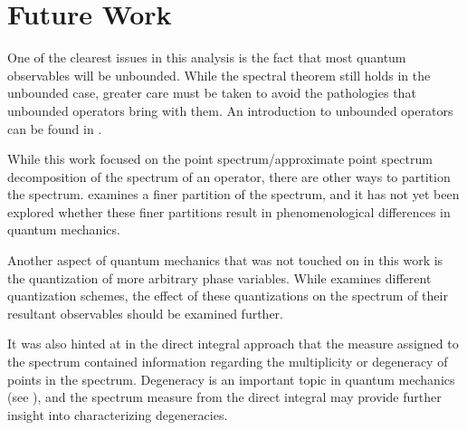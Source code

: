 \section{Future Work}
One of the clearest issues in this analysis is the fact that most quantum
observables will be unbounded. While the spectral theorem still holds in the
unbounded case, greater care must be taken to avoid the pathologies that
unbounded operators bring with them. An introduction to unbounded operators can
be found in \cite[Ch. 9]{Hall2013}.

While this work focused on the point spectrum/approximate point spectrum
decomposition of the spectrum of an operator, there are other ways to partition
the spectrum. \cite{Kubrusly2008} examines a finer partition of the spectrum,
and it has not yet been explored whether these finer partitions result in
phenomenological differences in quantum mechanics.

Another aspect of quantum mechanics that was not touched on in this work is the
quantization of more arbitrary phase variables. While \cite[Ch. 13]{Hall2013}
examines different quantization schemes, the effect of these quantizations on
the spectrum of their resultant observables should be examined further.

It was also hinted at in the direct integral approach that the measure assigned
to the spectrum contained information regarding the multiplicity or degeneracy
of points in the spectrum. Degeneracy is an important topic in quantum
mechanics (see \cite[Ch. 6.2]{griffiths2005}), and the spectrum measure from the
direct integral may provide further insight into characterizing degeneracies.
